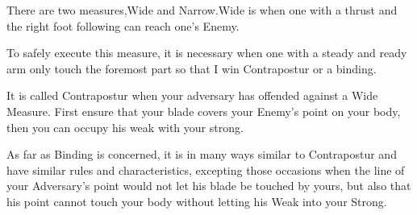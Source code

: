 \newpage


\newpage


 There are two measures,Wide and Narrow.Wide is when one with
 a thrust and the right foot following can reach one's Enemy.

To safely execute this measure, it is necessary when one with a steady and
ready arm only touch the foremost part so that I win Contrapostur or
a binding.

It is called Contrapostur when your adversary has offended against a
Wide Measure. First ensure that your blade covers your Enemy's point
on your body, then you can occupy his weak with your strong.

%

As far as Binding is concerned, it is in many ways similar to Contrapostur
and have similar rules and characteristics, excepting those occasions
when the line of your Adversary's point would not let his blade be
touched by yours, but also that his point cannot touch your body
without letting his Weak into your Strong.

